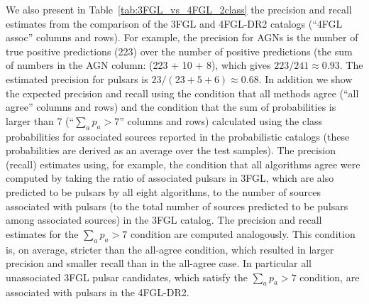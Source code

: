 \documentclass[referee]{aa} %
\begin{document}
We also present in Table~\ref{tab:3FGL_vs_4FGL_2class} the precision and recall estimates from the comparison of the 3FGL and 4FGL-DR2 catalogs (``4FGL assoc'' columns and rows).
For example, the precision for AGNs is the number of true positive predictions (223) over the number of positive predictions (the sum of numbers in the AGN column: (223 + 10 + 8), which gives $223 / 241 \approx 0.93$.
The estimated precision for pulsars is $ 23 / (23 + 5 + 6) \approx 0.68$.
In addition we show the expected precision and recall using the condition that all
methods agree (``all agree'' columns and rows) and the condition that the sum of probabilities is larger than 7 (``$\sum_a p_a > 7$'' columns and rows) calculated using the class probabilities for associated sources reported in the probabilistic catalogs (these probabilities are derived as an average over the test samples).
The precision (recall) estimates using, for example, the condition that all algorithms agree were computed by taking the ratio of associated pulsars in 3FGL, which are also predicted to be pulsars by all eight algorithms, to the number of sources associated with pulsars (to the total number of sources predicted to be pulsars among associated sources) in the 3FGL catalog.
The precision and recall estimates for the $\sum_a p_a > 7$ condition are computed analogously.
This condition is, on average, stricter than the all-agree condition, which resulted in larger precision and smaller recall than in the all-agree case.
In particular all unassociated 3FGL pulsar candidates, which satisfy the $\sum_a p_a > 7$ condition, are associated with pulsars in the 4FGL-DR2.
\end{document}

